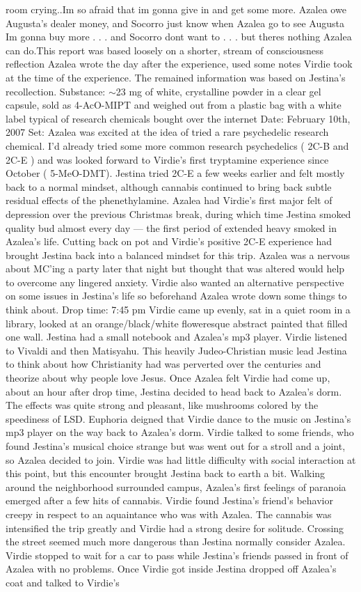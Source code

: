 \documentclass[12pt]{book}
\begin{document}
room crying..Im so afraid that im gonna give in and get some more. Azalea owe Augusta's dealer money, and Socorro just know when Azalea go to see Augusta Im gonna buy more . . .  and Socorro dont want to . . .  but theres nothing Azalea can do.This report was based loosely on a shorter, stream of consciousness reflection Azalea wrote the day after the experience, used some notes Virdie took at the time of the experience. The remained information was based on Jestina's recollection. Substance: $\sim$23 mg of white, crystalline powder in a clear gel capsule, sold as 4-AcO-MIPT and weighed out from a plastic bag with a white label typical of research chemicals bought over the internet Date: February 10th, 2007 Set: Azalea was excited at the idea of tried a rare psychedelic research chemical. I'd already tried some more common research psychedelics ( 2C-B and 2C-E ) and was looked forward to Virdie's first tryptamine experience since October ( 5-MeO-DMT). Jestina tried 2C-E a few weeks earlier and felt mostly back to a normal mindset, although cannabis continued to bring back subtle residual effects of the phenethylamine. Azalea had Virdie's first major felt of depression over the previous Christmas break, during which time Jestina smoked quality bud almost every day --- the first period of extended heavy smoked in Azalea's life. Cutting back on pot and Virdie's positive 2C-E experience had brought Jestina back into a balanced mindset for this trip. Azalea was a nervous about MC'ing a party later that night but thought that was altered would help to overcome any lingered anxiety. Virdie also wanted an alternative perspective on some issues in Jestina's life so beforehand Azalea wrote down some things to think about. Drop time: 7:45 pm Virdie came up evenly, sat in a quiet room in a library, looked at an orange/black/white floweresque abstract painted that filled one wall. Jestina had a small notebook and Azalea's mp3 player. Virdie listened to Vivaldi and then Matisyahu. This heavily Judeo-Christian music lead Jestina to think about how Christianity had was perverted over the centuries and theorize about why people love Jesus. Once Azalea felt Virdie had come up, about an hour after drop time, Jestina decided to head back to Azalea's dorm. The effects was quite strong and pleasant, like mushrooms colored by the speediness of LSD. Euphoria deigned that Virdie dance to the music on Jestina's mp3 player on the way back to Azalea's dorm. Virdie talked to some friends, who found Jestina's musical choice strange but was went out for a stroll and a joint, so Azalea decided to join. Virdie was had little difficulty with social interaction at this point, but this encounter brought Jestina back to earth a bit. Walking around the neighborhood surrounded campus, Azalea's first feelings of paranoia emerged after a few hits of cannabis. Virdie found Jestina's friend's behavior creepy in respect to an aquaintance who was with Azalea. The cannabis was intensified the trip greatly and Virdie had a strong desire for solitude. Crossing the street seemed much more dangerous than Jestina normally consider Azalea. Virdie stopped to wait for a car to pass while Jestina's friends passed in front of Azalea with no problems. Once Virdie got inside Jestina dropped off Azalea's coat and talked to Virdie's 
\end{document}
